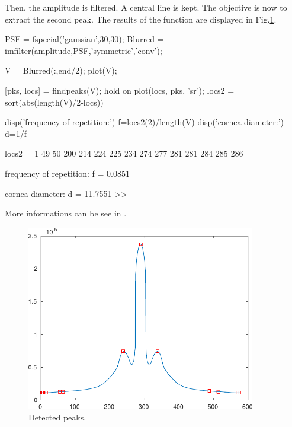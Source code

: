Then, the amplitude is filtered. A central line is kept. The objective is now to extract the second peak. The results of the  function are displayed in Fig.\ref{fig:fourier:matlab:peaks}.

\begin{matlab}
PSF = fspecial('gaussian',30,30);
Blurred = imfilter(amplitude,PSF,'symmetric','conv');

V = Blurred(:,end/2);
plot(V);

[pks, locs] = findpeaks(V);
hold on
plot(locs, pks, 'sr');
locs2 = sort(abs(length(V)/2-locs))

disp('frequency of repetition:')
f=locs2(2)/length(V)
disp('cornea diameter:')
d=1/f
\end{matlab}

\begin{mwindow}
locs2 =
     1
    49
    50
   200
   214
   224
   225
   234
   274
   277
   281
   281
   284
   285
   286

frequency of repetition:
f =
    0.0851

cornea diameter:
d =
   11.7551
>>
\end{mwindow}

More informations can be see in \cite{Ruggeri2005,Grisan2005,Ruggeri2007,Selig2015}.

\begin{figure}[htbp]
\centering
\includegraphics[width=10cm]{peaks.pdf}
 \caption{Detected peaks.}
 \label{fig:fourier:matlab:peaks}
\end{figure}
